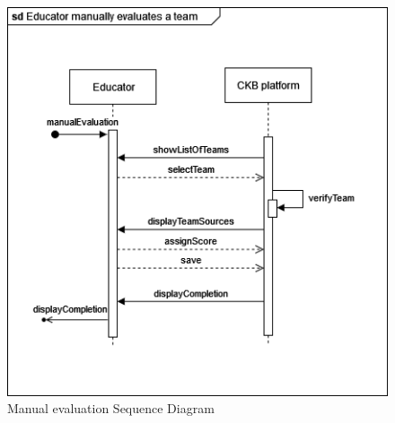 \begin{center}
    \begin{figure} [H]
        \begin{center}
            \includegraphics[width=0.9\linewidth]{Images/SequenceDiagrams/SD_16.png}
            \caption{Manual evaluation Sequence Diagram}
            \label{fig: manual_evaluation_seq_diag}
        \end{center}
    \end{figure}
\end{center}


